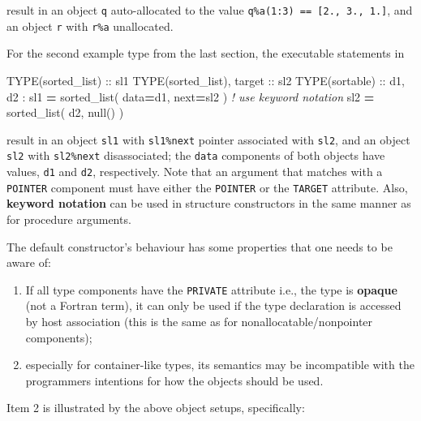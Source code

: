 \documentclass[
  paper=a4,
  ,captions=tableheading
]{scrartcl}
\newenvironment{Shaded}{\begin{snugshade}}{\end{snugshade}}
\newcommand{\CommentTok}[1]{\textcolor[rgb]{0.56,0.35,0.01}{\textit{#1}}}
\newcommand{\DataTypeTok}[1]{\textcolor[rgb]{0.13,0.29,0.53}{#1}}
\newcommand{\KeywordTok}[1]{\textcolor[rgb]{0.13,0.29,0.53}{\textbf{#1}}}
\newcommand{\NormalTok}[1]{#1}
\providecommand{\tightlist}{%
  \setlength{\itemsep}{0pt}\setlength{\parskip}{0pt}}
\begin{document}
result in an object \texttt{q} auto-allocated to the value
\texttt{q\%a(1:3)\ ==\ {[}2.,\ 3.,\ 1.{]}}, and an object \texttt{r}
with \texttt{r\%a} unallocated.

For the second example type from the last section, the executable
statements in

\begin{Shaded}
\begin{Highlighting}[]
\DataTypeTok{TYPE(sorted\_list)} \DataTypeTok{::}\NormalTok{ sl1}
\DataTypeTok{TYPE(sorted\_list)}\NormalTok{, }\DataTypeTok{target} \DataTypeTok{::}\NormalTok{ sl2}
\DataTypeTok{TYPE(sortable)} \DataTypeTok{::}\NormalTok{ d1, d2}
\NormalTok{:}
\NormalTok{sl1 }\KeywordTok{=}\NormalTok{ sorted\_list( data}\KeywordTok{=}\NormalTok{d1, next}\KeywordTok{=}\NormalTok{sl2 )  }\CommentTok{! use keyword notation}
\NormalTok{sl2 }\KeywordTok{=}\NormalTok{ sorted\_list( d2, null() )}
\end{Highlighting}
\end{Shaded}

result in an object \texttt{sl1} with \texttt{sl1\%next} pointer
associated with \texttt{sl2}, and an object \texttt{sl2} with
\texttt{sl2\%next} disassociated; the \texttt{data} components of both
objects have values, \texttt{d1} and \texttt{d2}, respectively. Note
that an argument that matches with a \texttt{POINTER} component must
have either the \texttt{POINTER} or the \texttt{TARGET} attribute. Also,
\textbf{keyword notation} can be used in structure constructors in the
same manner as for procedure arguments.

The default constructor's behaviour has some properties that one needs
to be aware of:

\begin{enumerate}
\def\labelenumi{\arabic{enumi}.}
\tightlist
\item
  If all type components have the \texttt{PRIVATE} attribute i.e., the
  type is \textbf{opaque} (not a Fortran term), it can only be used if
  the type declaration is accessed by host association (this is the same
  as for nonallocatable/nonpointer components);
\item
  especially for container-like types, its semantics may be incompatible
  with the programmers intentions for how the objects should be used.
\end{enumerate}

Item 2 is illustrated by the above object setups, specifically:
\end{document}
